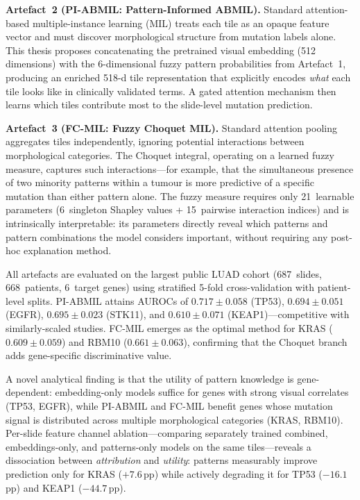 \textbf{Artefact~2 (PI-ABMIL: Pattern-Informed ABMIL).}
Standard attention-based multiple-instance learning (MIL) treats
each tile as an opaque feature vector and must discover
morphological structure from mutation labels alone.
This thesis proposes concatenating the pretrained visual embedding
(512 dimensions) with the 6-dimensional fuzzy pattern probabilities
from Artefact~1, producing an enriched 518-d tile representation
that explicitly encodes \emph{what} each tile looks like in
clinically validated terms.
A gated attention mechanism then learns which tiles contribute most
to the slide-level mutation prediction.

\textbf{Artefact~3 (FC-MIL: Fuzzy Choquet MIL).}
Standard attention pooling aggregates tiles independently, ignoring
potential interactions between morphological categories.
The Choquet integral, operating on a learned fuzzy measure, captures
such interactions---for example, that the simultaneous presence of
two minority patterns within a tumour is more predictive of a
specific mutation than either pattern alone.
The fuzzy measure requires only 21~learnable parameters (6~singleton
Shapley values + 15~pairwise interaction indices) and is
intrinsically interpretable: its parameters directly reveal which
patterns and pattern combinations the model considers important,
without requiring any post-hoc explanation method.

All artefacts are evaluated on the largest public LUAD cohort
(687~slides, 668~patients, 6~target genes) using stratified
5-fold cross-validation with patient-level splits.
PI-ABMIL attains AUROCs of $0.717 \pm 0.058$
(TP53), $0.694 \pm 0.051$ (EGFR), $0.695 \pm 0.023$ (STK11),
and $0.610 \pm 0.071$ (KEAP1)---competitive with similarly-scaled
studies.
FC-MIL emerges as the optimal method for KRAS
($0.609 \pm 0.059$) and RBM10 ($0.661 \pm 0.063$), confirming
that the Choquet branch adds gene-specific discriminative value.

A novel analytical finding is that the utility of pattern knowledge
is gene-dependent: embedding-only models suffice for genes with
strong visual correlates (TP53, EGFR), while PI-ABMIL and
FC-MIL benefit genes whose mutation signal is distributed
across multiple morphological categories (KRAS, RBM10).
Per-slide feature channel ablation---comparing separately trained
combined, embeddings-only, and patterns-only models on the same
tiles---reveals a dissociation between \emph{attribution} and
\emph{utility}: patterns measurably improve prediction only for
KRAS ($+7.6$\,pp) while actively degrading it for TP53
($-16.1$\,pp) and KEAP1 ($-44.7$\,pp).

